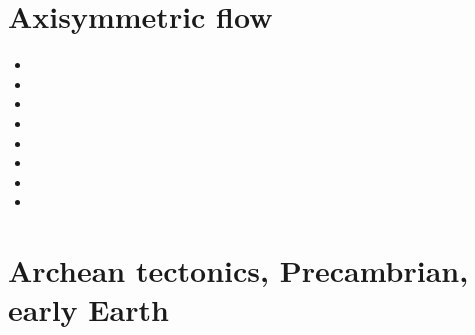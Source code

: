 \section{Axisymmetric flow}

\begin{small}
\begin{itemize}
\item[1985]
\item[\nineteenninetytwo] 
\item[\nineteenninetyseven] 
\item[\twothousandthree] 
\item[\twothousandfour] 
\item[\twothousandseven] 
\item[\twothousandten] 
\item[\twothousandtwelve] 
\end{itemize}
\end{small}

\section{Archean tectonics, Precambrian, early Earth}

